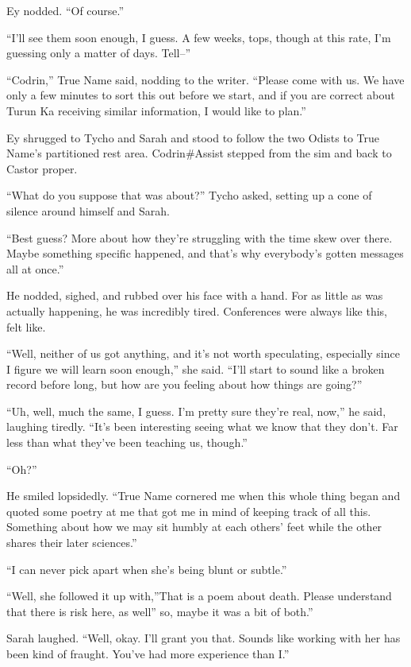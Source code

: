 Ey nodded. ``Of course.''

``I'll see them soon enough, I guess. A few weeks, tops, though at this rate, I'm guessing only a matter of days. Tell--''

``Codrin,'' True Name said, nodding to the writer. ``Please come with us. We have only a few minutes to sort this out before we start, and if you are correct about Turun Ka receiving similar information, I would like to plan.''

Ey shrugged to Tycho and Sarah and stood to follow the two Odists to True Name's partitioned rest area. Codrin\#Assist stepped from the sim and back to Castor proper.

``What do you suppose that was about?'' Tycho asked, setting up a cone of silence around himself and Sarah.

``Best guess? More about how they're struggling with the time skew over there. Maybe something specific happened, and that's why everybody's gotten messages all at once.''

He nodded, sighed, and rubbed over his face with a hand. For as little as was actually happening, he was incredibly tired. Conferences were always like this, felt like.

``Well, neither of us got anything, and it's not worth speculating, especially since I figure we will learn soon enough,'' she said. ``I'll start to sound like a broken record before long, but how are you feeling about how things are going?''

``Uh, well, much the same, I guess. I'm pretty sure they're real, now,'' he said, laughing tiredly. ``It's been interesting seeing what we know that they don't. Far less than what they've been teaching us, though.''

``Oh?''

He smiled lopsidedly. ``True Name cornered me when this whole thing began and quoted some poetry at me that got me in mind of keeping track of all this. Something about how we may sit humbly at each others' feet while the other shares their later sciences.''

``I can never pick apart when she's being blunt or subtle.''

``Well, she followed it up with,''That is a poem about death. Please understand that there is risk here, as well'' so, maybe it was a bit of both.''

Sarah laughed. ``Well, okay. I'll grant you that. Sounds like working with her has been kind of fraught. You've had more experience than I.''

